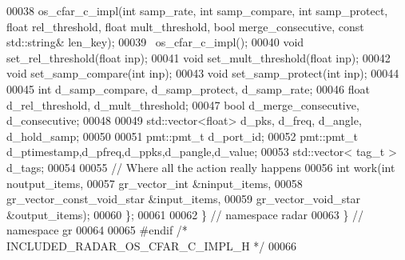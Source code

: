 \begin{DoxyCode}
00038       os_cfar_c_impl(\textcolor{keywordtype}{int} samp_rate, \textcolor{keywordtype}{int} samp\_compare, \textcolor{keywordtype}{int} samp\_protect, \textcolor{keywordtype}{float} rel\_threshold, \textcolor{keywordtype}{float} 
      mult\_threshold, \textcolor{keywordtype}{bool} merge\_consecutive, \textcolor{keyword}{const} std::string& len\_key);
00039       ~os_cfar_c_impl();
00040       \textcolor{keywordtype}{void} set_rel_threshold(\textcolor{keywordtype}{float} inp);
00041       \textcolor{keywordtype}{void} set_mult_threshold(\textcolor{keywordtype}{float} inp);
00042       \textcolor{keywordtype}{void} set_samp_compare(\textcolor{keywordtype}{int} inp);
00043       \textcolor{keywordtype}{void} set_samp_protect(\textcolor{keywordtype}{int} inp);
00044       
00045       \textcolor{keywordtype}{int} d_samp_compare, d_samp_protect, d_samp_rate;
00046       \textcolor{keywordtype}{float} d_rel_threshold, d_mult_threshold;
00047       \textcolor{keywordtype}{bool} d_merge_consecutive, d_consecutive;
00048       
00049       std::vector<float> d_pks, d_freq, d_angle, d_hold_samp;
00050       
00051       pmt::pmt\_t d_port_id;
00052       pmt::pmt\_t d_ptimestamp,d_pfreq,d_ppks,d_pangle,d_value;
00053       std::vector< tag\_t > d_tags;
00054 
00055       \textcolor{comment}{// Where all the action really happens}
00056       \textcolor{keywordtype}{int} work(\textcolor{keywordtype}{int} noutput\_items,
00057                gr\_vector\_int &ninput\_items,
00058                gr\_vector\_const\_void\_star &input\_items,
00059                gr\_vector\_void\_star &output\_items);
00060     \};
00061 
00062   \} \textcolor{comment}{// namespace radar}
00063 \} \textcolor{comment}{// namespace gr}
00064 
00065 \textcolor{preprocessor}{#endif }\textcolor{comment}{/* INCLUDED\_RADAR\_OS\_CFAR\_C\_IMPL\_H */}\textcolor{preprocessor}{}
00066 
\end{DoxyCode}
